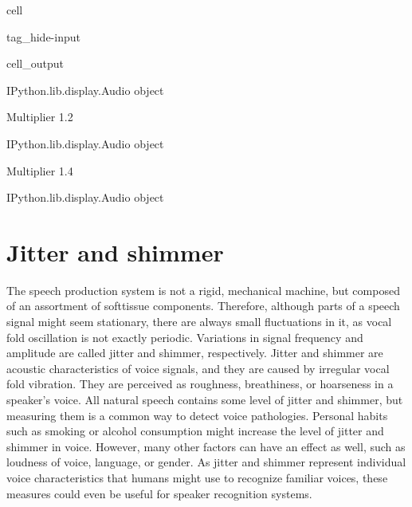 \documentclass[letterpaper,10pt,english]{jupyterBook}
\begin{document}
\begin{sphinxuseclass}{cell}
\begin{sphinxuseclass}{tag_hide-input}
\begin{sphinxVerbatimOutput}
\begin{sphinxuseclass}{cell_output}
\begin{sphinxVerbatim}[commandchars=\\\{\}]
\PYGZlt{}IPython.lib.display.Audio object\PYGZgt{}
\end{sphinxVerbatim}

\begin{sphinxVerbatim}[commandchars=\\\{\}]
Multiplier 1.2
\end{sphinxVerbatim}

\begin{sphinxVerbatim}[commandchars=\\\{\}]
\PYGZlt{}IPython.lib.display.Audio object\PYGZgt{}
\end{sphinxVerbatim}

\begin{sphinxVerbatim}[commandchars=\\\{\}]
Multiplier 1.4
\end{sphinxVerbatim}

\begin{sphinxVerbatim}[commandchars=\\\{\}]
\PYGZlt{}IPython.lib.display.Audio object\PYGZgt{}
\end{sphinxVerbatim}

\end{sphinxuseclass}\end{sphinxVerbatimOutput}

\end{sphinxuseclass}
\end{sphinxuseclass}
\sphinxstepscope


\section{Jitter and shimmer}
\label{\detokenize{Representations/Jitter_and_shimmer:jitter-and-shimmer}}\label{\detokenize{Representations/Jitter_and_shimmer::doc}}
\sphinxAtStartPar
The speech production system is not a rigid, mechanical machine, but
composed of an assortment of soft\sphinxhyphen{}tissue components. Therefore, although
parts of a speech signal might seem stationary, there are always small
fluctuations in it, as vocal fold oscillation is not exactly periodic.
Variations in signal frequency and amplitude are called jitter and
shimmer, respectively. Jitter and shimmer are acoustic characteristics
of voice signals, and they are caused by irregular vocal fold vibration.
They are perceived as roughness, breathiness, or hoarseness in a
speaker’s voice. All natural speech contains some level of jitter and
shimmer, but measuring them is a common way to detect voice pathologies.
Personal habits such as smoking or alcohol consumption might increase
the level of jitter and shimmer in voice. However, many other factors
can have an effect as well, such as loudness of voice, language, or
gender. As jitter and shimmer represent individual voice characteristics
that humans might use to recognize familiar voices, these measures could
even be useful for speaker recognition systems.
\end{document}
